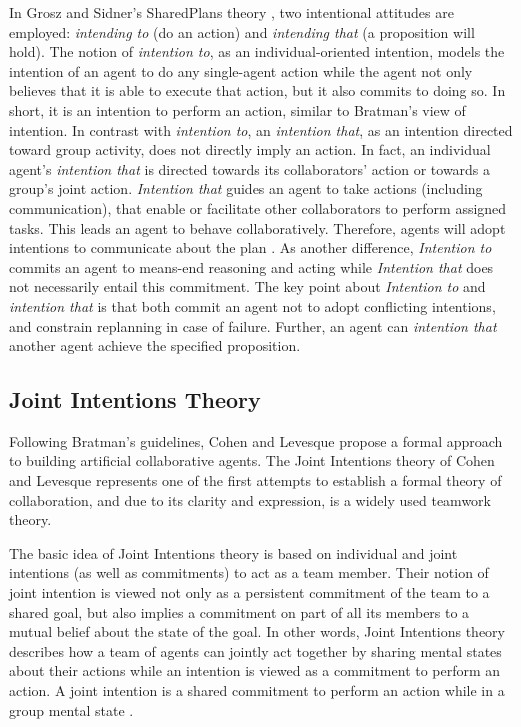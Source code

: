 \documentclass[12pt]{report}
\begin{document}
In Grosz and Sidner's SharedPlans theory \cite{grosz:plans-discourse}, two
intentional attitudes are employed: \textit{intending to} (do an action) and
\textit{intending that} (a proposition will hold). The notion of
\textit{intention to}, as an individual-oriented intention, models the intention
of an agent to do any single-agent action while the agent not only believes that
it is able to execute that action, but it also commits to doing so. In short,
it is an intention to perform an action, similar to Bratman's view of intention.
In contrast with \textit{intention to}, an \textit{intention that}, as an
intention directed toward group activity, does not directly imply an action. In
fact, an individual agent's \textit{intention that} is directed towards its
collaborators' action or towards a group's joint action. \textit{Intention that}
guides an agent to take actions (including communication), that enable or
facilitate other collaborators to perform assigned tasks. This leads an agent to
behave collaboratively. Therefore, agents will adopt intentions to communicate
about the plan \cite{grosz:collaboration}. As another difference,
\textit{Intention to} commits an agent to means-end reasoning and acting
\cite{bratman:intentions-plans} while \textit{Intention that} does not
necessarily entail this commitment. The key point about \textit{Intention to}
and \textit{intention that} is that both commit an agent not to adopt
conflicting intentions, and constrain replanning in case of failure. Further, an
agent can \textit{intention that} another agent achieve the specified
proposition.

\subsection{Joint Intentions Theory}
\label{sec:joint-intentions}

Following Bratman's guidelines, Cohen and Levesque propose a formal approach to
building artificial collaborative agents. The Joint Intentions theory of Cohen
and Levesque \cite{cohen:teamwork, cohen:intention-commitment,
cohen:persistence-intention-commitment, cohen:intentions,
levesque:acting-together} represents one of the first attempts to establish a
formal theory of collaboration, and due to its clarity and expression, is a
widely used teamwork theory.

The basic idea of Joint Intentions theory is based on individual and joint
intentions (as well as commitments) to act as a team member. Their notion of
joint intention is viewed not only as a persistent commitment of the team to a
shared goal, but also implies a commitment on part of all its members to a
mutual belief about the state of the goal. In other words, Joint Intentions
theory describes how a team of agents can jointly act together by sharing mental
states about their actions while an intention is viewed as a commitment to
perform an action. A joint intention is a shared commitment to perform an action
while in a group mental state \cite{cohen:intention-commitment}.
\end{document}
